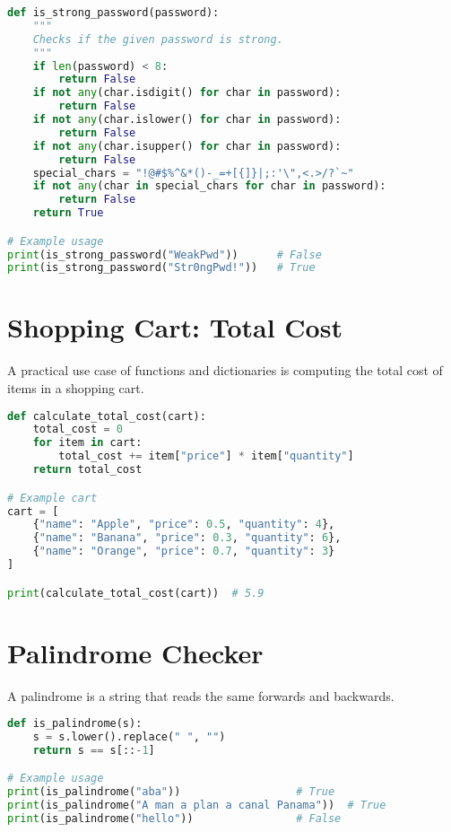 \begin{lstlisting}[language=Python, caption={Password strength checker}]
def is_strong_password(password):
    """
    Checks if the given password is strong.
    """
    if len(password) < 8:
        return False
    if not any(char.isdigit() for char in password):
        return False
    if not any(char.islower() for char in password):
        return False
    if not any(char.isupper() for char in password):
        return False
    special_chars = "!@#$%^&*()-_=+[{]}|;:'\",<.>/?`~"
    if not any(char in special_chars for char in password):
        return False
    return True

# Example usage
print(is_strong_password("WeakPwd"))      # False
print(is_strong_password("Str0ngPwd!"))   # True
\end{lstlisting}

\section{Shopping Cart: Total Cost}

A practical use case of functions and dictionaries is computing the total cost of items in a shopping cart.

\begin{lstlisting}[language=Python, caption={Calculating total cost of shopping cart}]
def calculate_total_cost(cart):
    total_cost = 0
    for item in cart:
        total_cost += item["price"] * item["quantity"]
    return total_cost

# Example cart
cart = [
    {"name": "Apple", "price": 0.5, "quantity": 4},
    {"name": "Banana", "price": 0.3, "quantity": 6},
    {"name": "Orange", "price": 0.7, "quantity": 3}
]

print(calculate_total_cost(cart))  # 5.9
\end{lstlisting}

\section{Palindrome Checker}

A palindrome is a string that reads the same forwards and backwards.

\begin{lstlisting}[language=Python, caption={Palindrome check}]
def is_palindrome(s):
    s = s.lower().replace(" ", "")
    return s == s[::-1]

# Example usage
print(is_palindrome("aba"))                  # True
print(is_palindrome("A man a plan a canal Panama"))  # True
print(is_palindrome("hello"))                # False
\end{lstlisting}

